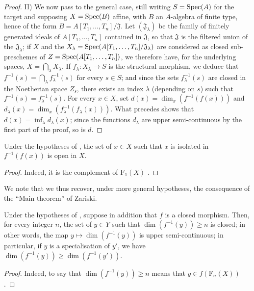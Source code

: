 \begin{proof}
II) We now pass to the general case, still writing $S=\operatorname{Spec}(A)$ for the target and supposing $X=\operatorname{Spec}(B)$ affine, with $B$ an $A$-algebra of finite type, hence of the form
$B=A[T_1,\ldots,T_n]/\mathfrak{J}$.
Let $(\mathfrak{J}_\lambda)$ be the family of finitely generated ideals of $A[T_1,\ldots,T_n]$ contained in $\mathfrak{J}$, so that $\mathfrak{J}$ is the filtered union of the $\mathfrak{J}_\lambda$; if $X$ and the $X_\lambda=\operatorname{Spec}(A[T_1,\ldots,T_n]/\mathfrak{J}_\lambda)$ are considered as closed sub-preschemes of $Z=\operatorname{Spec}(A[T_1,\ldots,T_n])$, we therefore have, for the underlying spaces, $X=\bigcap_\lambda X_\lambda$.
If $f_\lambda:X_\lambda\to S$ is the structural morphism, we deduce that $f^{-1}(s)=\bigcap_\lambda f_\lambda^{-1}(s)$ for every $s\in S$; and since the sets $f_\lambda^{-1}(s)$ are closed in the Noetherian space $Z_s$, there exists an index $\lambda$ (depending on $s$) such that $f^{-1}(s)=f_\lambda^{-1}(s)$.
For every $x\in X$, set $d(x)=\dim_x(f^{-1}(f(x)))$ and $d_\lambda(x)=\dim_x(f_\lambda^{-1}(f_\lambda(x)))$. What precedes shows that $d(x)=\inf_\lambda d_\lambda(x)$; since the functions $d_\lambda$ are upper semi-continuous by the first part of the proof, so is $d$.
\end{proof}

\begin{corollary}[13.1.4]
\label{IV.13.1.4}
Under the hypotheses of , the set of $x\in X$ such that $x$ is isolated in $f^{-1}(f(x))$ is open in $X$.
\end{corollary}

\begin{proof}
Indeed, it is the complement of $\mathrm{F}_1(X)$ .
\end{proof}

We note that we thus recover, under more general hypotheses, the consequence  of the ``Main theorem'' of Zariski.

\begin{corollary}[13.1.5]
\label{IV.13.1.5}
Under the hypotheses of , suppose in addition that $f$ is a closed morphism.
Then, for every integer $n$, the set of $y\in Y$ such that $\dim(f^{-1}(y))\geq n$ is closed; in other words, the map $y\mapsto\dim(f^{-1}(y))$ is upper semi-continuous; in particular, if $y$ is a specialisation of $y'$, we have $\dim(f^{-1}(y))\geq\dim(f^{-1}(y'))$.
\end{corollary}

\begin{proof}
Indeed, to say that $\dim(f^{-1}(y))\geq n$ means that $y\in f(\mathrm{F}_n(X))$ .
\end{proof}

